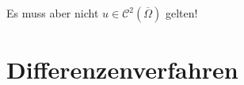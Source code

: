\documentclass{cheat-sheet}
\newcommand{\Cont}{\mathcal{C}} %
\newcommand{\clos}[1]{\overline{#1}} %
\newcommand{\cOmega}{\clos{\Omega}} %
\newcommand{\bOmega}{\partial \Omega} %
\newcommand{\Laplace}{\Delta}
\begin{document}

\begin{acht}
  Es muss aber nicht $u \in \Cont^2(\cOmega)$ gelten!
\end{acht}

\iffalse
\begin{bspe}
  \begin{itemize}
    \item $- \Laplace u = 0$ in $\ointerval{0}{1} \times \ointerval{0}{1}$, $u(0, x_2) = 0$, $u(1, x_2) = x_2$, $u(x_1, 0) = 0$, $u(x_1, 1) = x_1$ für $x_1, x_2 \in \cinterval{0}{1}$.
    Lösung: $u(x_1, x_2) = x_1 x_2$
    \item $- \Laplace u = 0$ in $\Omega = \ointerval{0}{1} \times \ointerval{0}{1}$,
    $u(x_1, x_2) = x_1^2$.
    Nach Satz 2.5 existiert eine Lösung $u \in \Cont^2(\Omega) \cap \Cont(\cOmega)$ aber $u \not\in \Cont^2(\cOmega)$, denn
    \[ \tfrac{\partial^2 u}{\partial x_1^2} + \tfrac{\partial^2 u}{\partial x_2^2} = 2 \neq 0 \]
    bei $x = (1, 1)$, auf $\bOmega$.
  \end{itemize}
\end{bspe}
\fi

\section{Differenzenverfahren}

\end{document}
